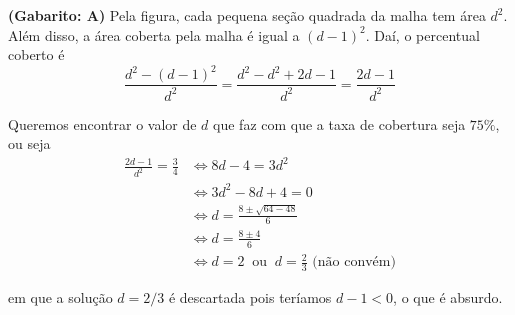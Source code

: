 \documentclass[a4paper]{article}
\begin{document}
\par\textbf{(Gabarito: A)} Pela figura, cada pequena seção quadrada da malha tem área $d^2$. Além disso, a área coberta pela malha é igual a $(d-1)^2$. Daí, o percentual coberto é 
\begin{equation*}
\displaystyle{ \frac{d^2 - (d-1)^2}{d^2} = \frac{d^2 - d^2+2d-1}{d^2} =  \frac{2d - 1}{d^2} }
\end{equation*}
\par\vspace{0.3cm} Queremos encontrar o valor de $d$ que faz com que a taxa de cobertura seja $75\%$, ou seja
\begin{align*}
\frac{2d-1}{d^2} = \frac{3}{4} &\iff 8d - 4 = 3d^2 \\
&\iff 3d^2 - 8d + 4 = 0 \\
&\iff d = \frac{8\pm\sqrt{64-48}}{6} \\
&\iff d = \frac{8\pm 4}{6} \\
&\iff d = 2 \ \text{ ou } \ d = \frac{2}{3}\text{ (não convém)}
\end{align*}
\par\vspace{0.3cm} em que a solução $d = 2/3$ é descartada pois teríamos $d - 1<0$, o que é absurdo.
\end{document}

